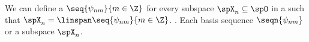 %
%
We can define a  $\seq{\psi_{nm}}{m\in\Z}$
for every subspace $\spX_n\subseteq\spO$
in a  such that
$\spX_n = \linspan\seq{\psi_{nm}}{m\in\Z}$.
.
Each basis sequence $\seqn{\psi_{nm}}$  or  a subspace $\spX_n$.


